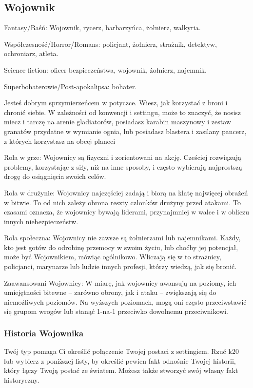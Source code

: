 \cleardoublepage

\subsection{Wojownik}

Fantasy/Baśń: Wojownik, rycerz, barbarzyńca, żołnierz, walkyria.

Współczesność/Horror/Romans: policjant, żołnierz, strażnik, detektyw, ochroniarz, atleta.

Science fiction: oficer bezpieczeństwa, wojownik, żołnierz, najemnik.

Superbohaterowie/Post-apokalipsa: bohater. 

Jesteś dobrym sprzymierzeńcem w potyczce. Wiesz, jak korzystać z broni i chronić siebie. W zależności od konwencji i settingu, może to znaczyć, że nosisz miecz i tarczę na arenie gladiatorów, posiadasz karabin maszynowy i zestaw granatów przydatne w wymianie ognia, lub posiadasz blastera i zasilany pancerz, z których korzystasz na obcej planeci

Rola w grze: Wojownicy są fizyczni i zorientowani na akcję. Cześciej rozwiązują problemy, korzystając z siły, niż na inne sposoby, i często wybierają najprostszą drogę do osiągnięcia swoich celów. 

Rola w drużynie: Wojownicy najczęściej zadają i biorą na klatę najwięcej obrażeń w bitwie. To od nich zależy obrona reszty członków drużyny przed atakami. To czasami oznacza, że wojownicy bywają liderami, przynajmniej w walce i w obliczu innych niebezpieczeństw.

Rola społeczna: Wojownicy nie zawsze są żołnierzami lub najemnikami. Każdy, kto jest gotów do odrobinę przemocy w swoim życiu, lub choćby jej potencjał, może być Wojownikiem, mówiąc ogólnikowo. Wliczają się w to strażnicy, policjanci, marynarze lub ludzie innych profesji, którzy wiedzą, jak się bronić.

Zaawansowani Wojownicy: W miarę, jak wojownicy awansują na poziomy, ich umiejętności bitewne – zarówno obrony, jak i ataku – zwiększają się do niemożliwych poziomów. Na wyższych poziomach, mogą oni często przeciwstawić się grupom wrogów lub stanąć 1-na-1 przeciwko dowolnemu przeciwnikowi.

\subsubsection{Historia Wojownika}

Twój typ pomaga Ci określić połączenie Twojej postaci z settingiem. Rzuć k20 lub wybierz z poniższej listy, by określić pewien fakt odnośnie Twojej historii, który łączy Twoją postać ze światem. Możesz także stworzyć swój własny fakt historyczny.

